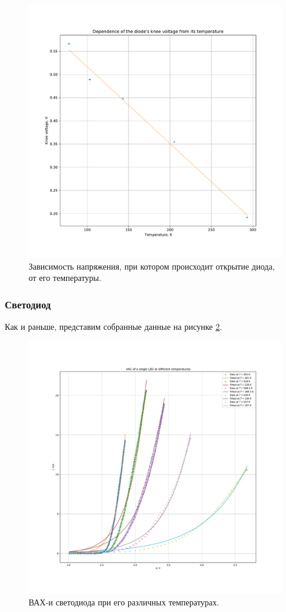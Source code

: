 \documentclass[a4paper, 12pt]{article}
\begin{document}
\begin{figure}[H]
	\centering
	\includegraphics[width=\linewidth]{2_Knee_Diode}
	\caption{Зависимость напряжения, при котором происходит открытие диода, от его температуры.}
	\label{fig:2_Knee_Diode}
\end{figure}

\subsubsection{Светодиод}

Как и раньше, представим собранные данные на рисунке \ref{fig:2_LED}.

\begin{figure}[H]
	\centering
	\includegraphics[width=\linewidth]{2_LED}
	\caption{ВАХ-и светодиода при его различных температурах.}
	\label{fig:2_LED}
\end{figure}
\end{document}
